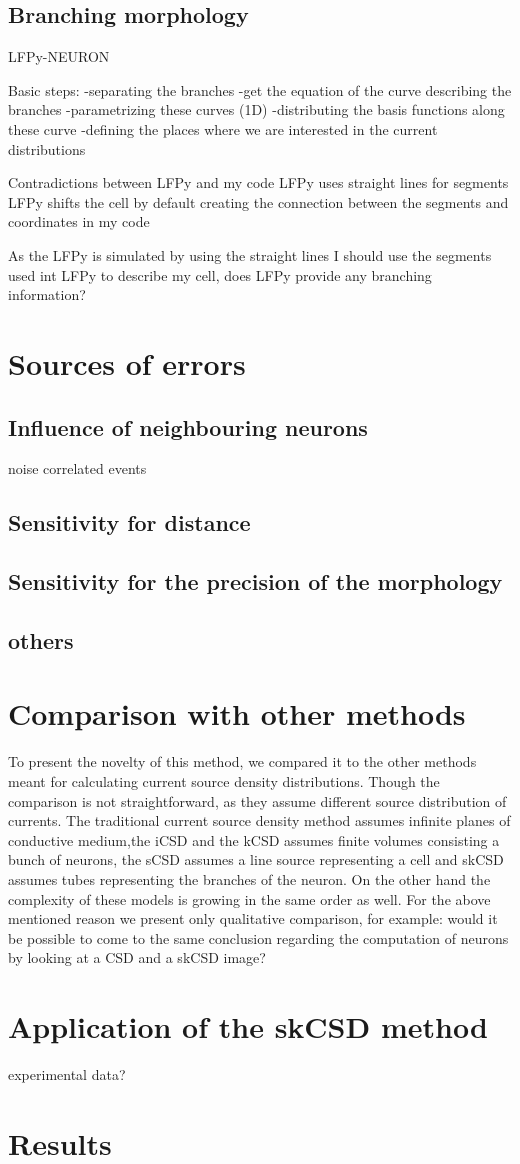 \documentclass[12pt,a4paper]{article}
\begin{document}
\subsection{Branching morphology}



LFPy-NEURON

Basic steps:
-separating the branches
-get the equation of the curve describing the branches
-parametrizing these curves (1D)
-distributing the basis functions along these curve
-defining the places where we are interested in the current distributions
 
Contradictions between LFPy and my code
LFPy uses straight lines for segments
LFPy shifts the cell by default 
creating the connection between the segments and coordinates in my code

As the LFPy is simulated by using the straight lines I should use the segments used int LFPy to describe my cell, does LFPy provide any branching information?


\section{Sources of errors}
\subsection{Influence of neighbouring neurons }
noise
correlated events
\subsection{Sensitivity for distance }
\subsection{Sensitivity for the precision of the morphology}
\subsection{others}


\section{Comparison with other methods}
To present the novelty of this method, we compared it to the other methods meant for calculating current source density distributions. Though the comparison is not straightforward, as they assume different source distribution of currents. The traditional current source density method assumes infinite planes of conductive medium,the iCSD and the kCSD assumes finite volumes consisting a bunch of neurons, the sCSD assumes a line source representing a cell and skCSD assumes tubes representing the branches of the neuron. On the other hand the complexity of these models is growing in the same order as well.
For the above mentioned reason we present only qualitative comparison, for example: would it be possible to come to the same conclusion regarding the computation of neurons by looking at a CSD and a skCSD image?

\section{Application of the skCSD method}
experimental data?
\section{Results}
\end{document}
